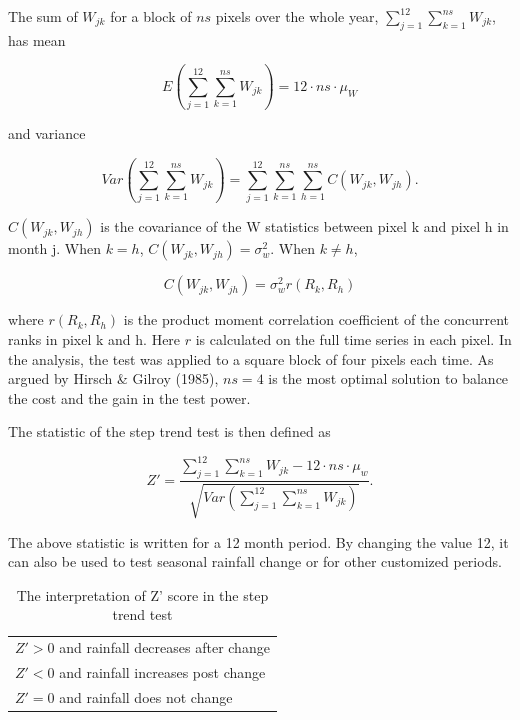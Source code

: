 \documentclass[fleqn,10pt,lineno]{wlpeerj} %
\theoremstyle{definition}
\theoremstyle{definition}
\theoremstyle{definition}
\theoremstyle{remark}
\begin{document}
The sum of \(W_{jk}\) for a block of \(ns\) pixels over the whole year,
\(\sum_{j=1}^{12}\sum_{k=1}^{ns}W_{jk}\), has mean

\begin{equation}
  E(\sum_{j=1}^{12}\sum_{k=1}^{ns}W_{jk})=12\cdot ns\cdot\mu_W
\end{equation}

and variance

\begin{equation}
  Var(\sum_{j=1}^{12}\sum_{k=1}^{ns}W_{jk})=\sum_{j=1}^{12}\sum_{k=1}^{ns}\sum_{h=1}^{ns}C(W_{jk},W_{jh}).
\end{equation}

\(C(W_{jk},W_{jh})\) is the covariance of the W statistics between pixel
k and pixel h in month j. When \(k=h\), \(C(W_{jk},W_{jh})=\sigma^2_w\).
When \(k\neq h\),

\begin{equation}
  C(W_{jk},W_{jh})=\sigma^2_w r(R_k,R_h)
\end{equation}

where \(r(R_k,R_h)\) is the product moment correlation coefficient of
the concurrent ranks in pixel k and h. Here \(r\) is calculated on the
full time series in each pixel. In the analysis, the test was applied to
a square block of four pixels each time. As argued by Hirsch \& Gilroy
(1985), \(ns=4\) is the most optimal solution to balance the cost and
the gain in the test power.

The statistic of the step trend test is then defined as

\begin{equation}
  Z'=\frac{\sum_{j=1}^{12}\sum_{k=1}^{ns}W_{jk}-12\cdot ns\cdot\mu_w}{\sqrt{Var(\sum_{j=1}^{12}\sum_{k=1}^{ns}W_{jk})}}.
  \label{eq:Z}
\end{equation}

The above statistic is written for a 12 month period. By changing the
value 12, it can also be used to test seasonal rainfall change or for
other customized periods.

\begin{table}[t]

\caption{\label{tab:Zscore}The interpretation of Z' score in the step trend test}
\centering
\begin{tabular}{l}
\toprule
 \\
\midrule
$Z'>0$  and rainfall decreases after change\\
$Z'<0$ and rainfall increases post change\\
$Z'=0$ and rainfall does not change\\
\bottomrule
\end{tabular}
\end{table}
\end{document}
